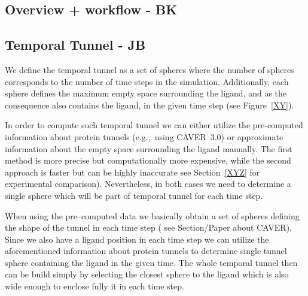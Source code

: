 \documentclass[twocolumn]{bmcart}%
\newcommand{\eg}{e.g.,~}
\begin{document}
\subsection*{Overview + workflow - BK}

\subsection*{Temporal Tunnel - JB}
\label{Sec:TemporalTunnel}


We define the temporal tunnel as a set of spheres where the number of spheres corresponds to the number of time steps in the simulation.
Additionally, each sphere defines the maximum empty space surrounding the ligand, and as the consequence also contains the ligand, in the given time step {\color{red}(see Figure~\ref{XY})}.

In order to compute such temporal tunnel we can either utilize the pre-computed information about protein tunnels (\eg using CAVER~3.0) or approximate information about the empty space surrounding the ligand manually. 
The first method is more precise but computationally more expensive, while the second approach is faster but {\color{red}can be highly inaccurate} {\color{red}see Section~\ref{XYZ} for experimental comparison)}. 
Nevertheless, in both cases we need to determine a single sphere which will be part of temporal tunnel for each time step.

When using the pre--computed data we basically obtain a set of spheres defining the shape of the tunnel in each time step ({\color{red} see Section/Paper about CAVER}). 
Since we also have a ligand position  in each time step we can utilize the aforementioned information about protein tunnels to determine single tunnel sphere containing the ligand in the given time. 
The whole temporal tunnel then can be build simply by selecting the closest sphere to the ligand which is also wide enough  to enclose fully it in each time step. 

\end{document}
